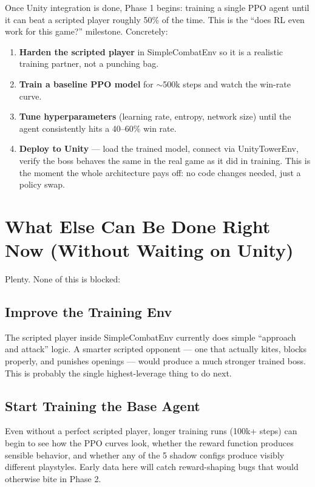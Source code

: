 \documentclass[11pt]{article}
\begin{document}
Once Unity integration is done, Phase 1 begins: training a single PPO agent until it can beat a scripted player roughly 50\% of the time. This is the ``does RL even work for this game?'' milestone. Concretely:

\begin{enumerate}[leftmargin=*]
    \item \textbf{Harden the scripted player} in SimpleCombatEnv so it is a realistic training partner, not a punching bag.
    \item \textbf{Train a baseline PPO model} for $\sim$500k steps and watch the win-rate curve.
    \item \textbf{Tune hyperparameters} (learning rate, entropy, network size) until the agent consistently hits a 40--60\% win rate.
    \item \textbf{Deploy to Unity} --- load the trained model, connect via UnityTowerEnv, verify the boss behaves the same in the real game as it did in training. This is the moment the whole architecture pays off: no code changes needed, just a policy swap.
\end{enumerate}

\section*{What Else Can Be Done Right Now (Without Waiting on Unity)}

Plenty. None of this is blocked:

\subsection*{Improve the Training Env}
The scripted player inside SimpleCombatEnv currently does simple ``approach and attack'' logic. A smarter scripted opponent --- one that actually kites, blocks properly, and punishes openings --- would produce a much stronger trained boss. This is probably the single highest-leverage thing to do next.

\subsection*{Start Training the Base Agent}
Even without a perfect scripted player, longer training runs (100k+ steps) can begin to see how the PPO curves look, whether the reward function produces sensible behavior, and whether any of the 5 shadow configs produce visibly different playstyles. Early data here will catch reward-shaping bugs that would otherwise bite in Phase 2.
\end{document}
